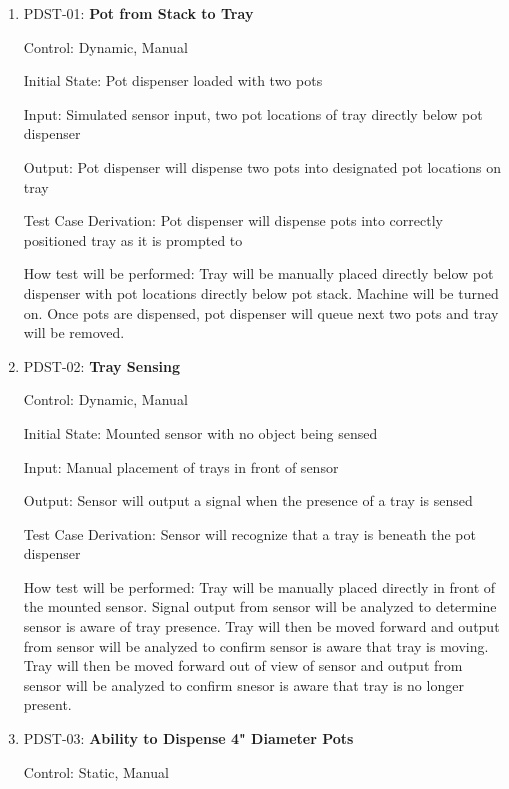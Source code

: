 \documentclass[12pt, titlepage]{article}
\begin{document}
\begin{enumerate}
 
  \item{PDST-01: \textbf{Pot from Stack to Tray}}
  
  Control: Dynamic, Manual
            
  Initial State: Pot dispenser loaded with two pots
            
  Input: Simulated sensor input, two pot locations of tray directly below pot dispenser
            
  Output: Pot dispenser will dispense two pots into designated pot locations on tray
  
  Test Case Derivation: Pot dispenser will dispense pots into correctly positioned tray as it is prompted to
            
  How test will be performed: Tray will be manually placed directly below pot dispenser with pot locations 
  directly below pot stack. Machine will be turned on. Once pots are dispensed, pot dispenser will 
  queue next two pots and tray will be removed.\\

  \item{PDST-02: \textbf{Tray Sensing}}
  
  Control: Dynamic, Manual
            
  Initial State: Mounted sensor with no object being sensed
            
  Input: Manual placement of trays in front of sensor
            
  Output: Sensor will output a signal when the presence of a tray is sensed
  
  Test Case Derivation: Sensor will recognize that a tray is beneath the pot dispenser
            
  How test will be performed: Tray will be manually placed directly in front of the mounted sensor. Signal 
  output from sensor will be analyzed to determine sensor is aware of tray presence. Tray will then be 
  moved forward and output from sensor will be analyzed to confirm sensor is aware that tray is moving. 
  Tray will then be moved forward out of view of sensor and output from sensor will be analyzed to confirm 
  snesor is aware that tray is no longer present.\\

  \item{PDST-03: \textbf{Ability to Dispense 4" Diameter Pots}}
  
  Control: Static, Manual


\end{enumerate}
\end{document}
